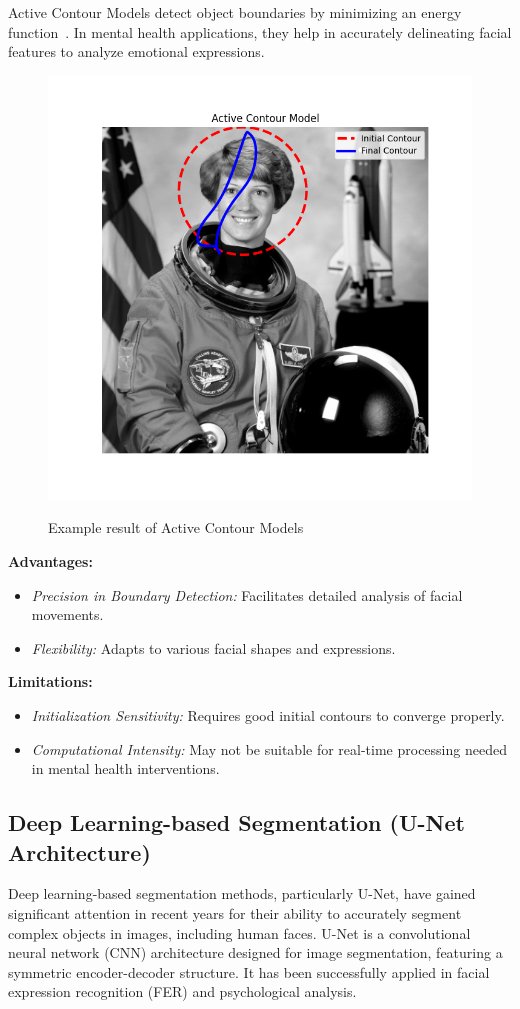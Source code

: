 \documentclass[lettersize,journal]{IEEEtran}
\begin{document}
Active Contour Models detect object boundaries by minimizing an energy function~\cite{Kass1988}. In mental health applications, they help in accurately delineating facial features to analyze emotional expressions.
\begin{figure}[H]
    \centering
    \includegraphics[width=0.7\linewidth]{Traditional FER/Active Contour Model.png} \\
    
    \caption{Example result of Active Contour Models\cite{van2014scikit}}
    \label{fig:lbp_combined}
\end{figure}
\textbf{Advantages:}
\begin{itemize}
    \item \emph{Precision in Boundary Detection:} Facilitates detailed analysis of facial movements.
    \item \emph{Flexibility:} Adapts to various facial shapes and expressions.
\end{itemize}

\textbf{Limitations:}
\begin{itemize}
    \item \emph{Initialization Sensitivity:} Requires good initial contours to converge properly.
    \item \emph{Computational Intensity:} May not be suitable for real-time processing needed in mental health interventions.
\end{itemize}

\subsection{Deep Learning-based Segmentation (U-Net Architecture)
}
Deep learning-based segmentation methods, particularly U-Net, have gained significant attention in recent years for their ability to accurately segment complex objects in images, including human faces. U-Net is a convolutional neural network (CNN) architecture designed for image segmentation, featuring a symmetric encoder-decoder structure. It has been successfully applied in facial expression recognition (FER) and psychological analysis.~\cite{Ibtehaz2020}
\end{document}

